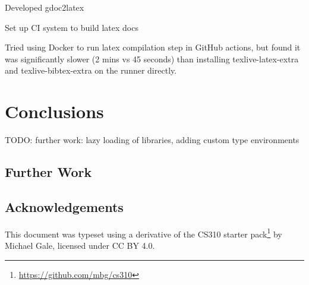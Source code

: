 \documentclass[a4paper,fleqn,12pt]{article}
\begin{document}
Developed gdoc2latex

Set up CI system to build latex docs

Tried using Docker to run latex compilation step in GitHub actions, but found it was significantly slower (2 mins vs 45 seconds) than installing texlive-latex-extra and texlive-bibtex-extra on the runner directly.
\section{Conclusions}\label{id:h.fc67ipatea73}
TODO: further work: lazy loading of libraries, adding custom type environments
\subsection{Further Work}\label{id:h.60yvcrl0lpu}
\subsection{Acknowledgements}\label{id:h.xqaef57orpsv}
This document was typeset using a derivative of the CS310 starter pack\footnote{\href{https://github.com/mbg/cs310}{https://github.com/mbg/cs310}} by Michael Gale, licensed under CC BY 4.0.










































\end{document}
